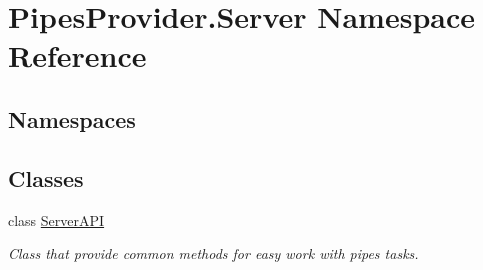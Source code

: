 \hypertarget{namespace_pipes_provider_1_1_server}{}\section{Pipes\+Provider.\+Server Namespace Reference}
\label{namespace_pipes_provider_1_1_server}
\subsection*{Namespaces}
\begin{DoxyCompactItemize}
\end{DoxyCompactItemize}
\subsection*{Classes}
\begin{DoxyCompactItemize}
\item 
class \mbox{\hyperlink{class_pipes_provider_1_1_server_1_1_server_a_p_i}{Server\+A\+PI}}
\begin{DoxyCompactList}\small\item\em Class that provide common methods for easy work with pipes\textquotesingle{} tasks. \end{DoxyCompactList}\end{DoxyCompactItemize}
